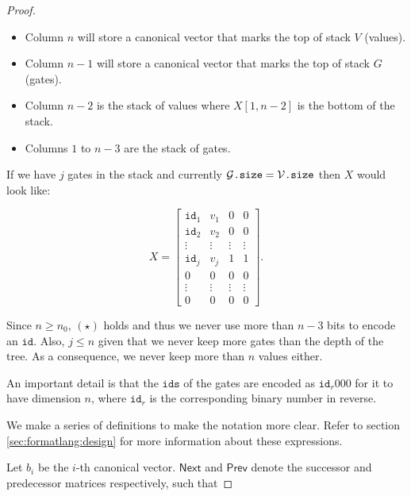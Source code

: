 \begin{proof}
    \begin{itemize}
        \item Column $n$ will store a canonical vector that marks the top of stack $V$ (values).
        \item Column $n-1$ will store a canonical vector that marks the top of stack $G$ (gates).
        \item Column $n-2$ is the stack of values where $X[1, n-2]$ is the bottom of the stack.
        \item Columns $1$ to $n-3$ are the stack of gates.
    \end{itemize}

    If we have $j$ gates in the stack and currently $\mathcal{G}\texttt{.size}=\mathcal{V}\texttt{.size}$ then $X$ would look like:

    \[
    X = \begin{bmatrix}
        \texttt{id}_1 & v_1 & 0 & 0 \\
        \texttt{id}_2 & v_2 & 0 & 0 \\
        \vdots & \vdots & \vdots & \vdots \\
        \texttt{id}_j & v_j & 1 & 1 \\
        0 & 0 & 0 & 0 \\
        \vdots & \vdots & \vdots & \vdots \\
        0 & 0 & 0 & 0
    \end{bmatrix}.
    \]

    Since $n\geq n_0$, $(\star)$ holds and thus we never use more than $n-3$ bits to encode an $\texttt{id}$. Also, $j\leq n$ given that we never keep more gates than the depth of the tree. As a consequence, we never keep more than $n$ values either.


    An important detail is that the $\texttt{ids}$ of the gates are encoded as $\texttt{id}_r000$ for it to have dimension $n$, where $\texttt{id}_r$ is the corresponding binary number in reverse.

    We make a series of definitions to make the notation more clear. Refer to section \ref{sec:formatlang:design} for more information
    about these expressions.

    Let $b_i$ be the $i$-th canonical vector. $\mathsf{Next}$ and $\mathsf{Prev}$ denote the successor and predecessor matrices respectively, such that


\end{proof}
